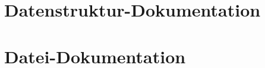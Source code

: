 \documentclass{book}
\begin{document}
\chapter{Datenstruktur-\/\-Dokumentation}




\chapter{Datei-\/\-Dokumentation}









\printindex
\end{document}
